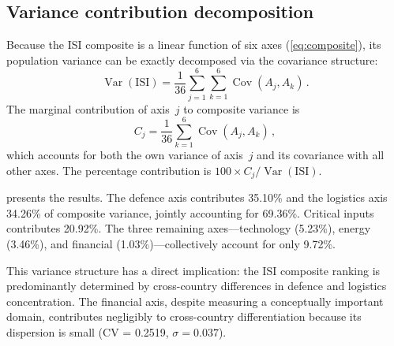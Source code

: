 \subsection{Variance contribution decomposition}\label{sec:variance-decomp}

Because the ISI composite is a linear function of six axes
(\cref{eq:composite}), its population variance can be exactly
decomposed via the covariance structure:
\begin{equation}\label{eq:var-decomp}
  \operatorname{Var}(\text{ISI})
  = \frac{1}{36}\sum_{j=1}^{6}\sum_{k=1}^{6}
    \operatorname{Cov}(A_j, A_k)
  \,.
\end{equation}
The marginal contribution of axis~$j$ to composite variance is
\begin{equation}\label{eq:marginal-contrib}
  C_j
  = \frac{1}{36}\sum_{k=1}^{6}\operatorname{Cov}(A_j, A_k)
  \,,
\end{equation}
which accounts for both the own variance of axis~$j$ and its
covariance with all other axes.  The percentage contribution is
$100 \times C_j / \operatorname{Var}(\text{ISI})$.



 presents the results.  The defence axis
contributes 35.10\% and the logistics axis 34.26\% of composite
variance, jointly accounting for 69.36\%.  Critical inputs contributes
20.92\%.  The three remaining axes---technology (5.23\%), energy
(3.46\%), and financial (1.03\%)---collectively account for only
9.72\%.

This variance structure has a direct implication: the ISI composite
ranking is predominantly determined by cross-country differences in
defence and logistics concentration.  The financial axis, despite
measuring a conceptually important domain, contributes negligibly to
cross-country differentiation because its dispersion is small (CV
= 0.2519, $\sigma = 0.037$).
